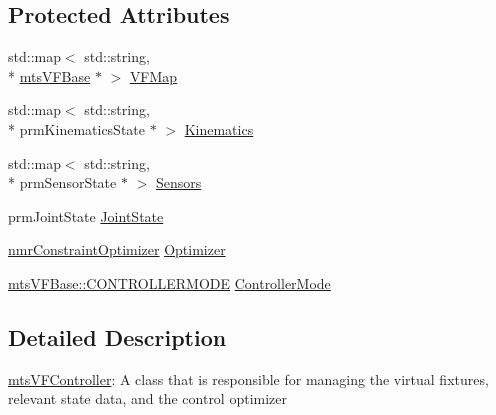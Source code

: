 \subsection*{Protected Attributes}
\begin{DoxyCompactItemize}
\item 
std\-::map$<$ std\-::string, \\*
\hyperlink{classmts_v_f_base}{mts\-V\-F\-Base} $\ast$ $>$ \hyperlink{classmts_v_f_controller_acf1cfa87ed1c4903f9b4e3c0b4885fa3}{V\-F\-Map}
\item 
std\-::map$<$ std\-::string, \\*
prm\-Kinematics\-State $\ast$ $>$ \hyperlink{classmts_v_f_controller_af130251a32e9663507ab4d0ecf2c1ebe}{Kinematics}
\item 
std\-::map$<$ std\-::string, \\*
prm\-Sensor\-State $\ast$ $>$ \hyperlink{classmts_v_f_controller_aaac004c01f9e1b4af5c64292c68d523e}{Sensors}
\item 
prm\-Joint\-State \hyperlink{classmts_v_f_controller_a1894d5892686513258336a288615a234}{Joint\-State}
\item 
\hyperlink{classnmr_constraint_optimizer}{nmr\-Constraint\-Optimizer} \hyperlink{classmts_v_f_controller_a434d49f47dff20bbe715be76221a98ba}{Optimizer}
\item 
\hyperlink{classmts_v_f_base_a742dd08f8b70bafeb746cec14d9ee974}{mts\-V\-F\-Base\-::\-C\-O\-N\-T\-R\-O\-L\-L\-E\-R\-M\-O\-D\-E} \hyperlink{classmts_v_f_controller_ad5340ab1ebdc9c7c0b1f66180ce70227}{Controller\-Mode}
\end{DoxyCompactItemize}


\subsection{Detailed Description}
\hyperlink{classmts_v_f_controller}{mts\-V\-F\-Controller}\-: A class that is responsible for managing the virtual fixtures, relevant state data, and the control optimizer 

